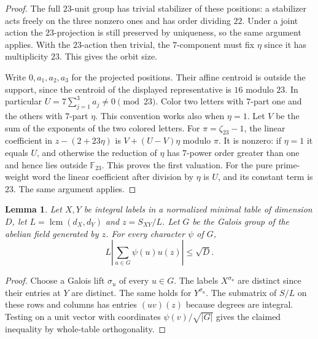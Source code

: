 \documentclass[11pt,a4paper]{article}
\numberwithin{equation}{section}
\newtheorem{lemma}[theorem]{Lemma}
\theoremstyle{remark}
\begin{document}
\begin{proof}
The full $23$-unit group has trivial stabilizer of these positions:
a stabilizer acts freely on the three nonzero ones and has order
dividing $22$. Under a joint action the $23$-projection is still
preserved by uniqueness, so the same argument applies. With the
$23$-action then trivial, the $7$-component must fix $\eta$ since
it has multiplicity $23$. This gives the orbit size.

Write $0,a_1,a_2,a_3$ for the projected positions.
Their affine centroid is outside the support,
since the centroid of the displayed representative is
$16$ modulo $23$. In particular $U=7\sum_{j=1}^3a_j\ne0\pmod{23}$.
Color two letters with $7$-part one and the others with $7$-part
$\eta$. This convention works also when $\eta=1$. Let $V$ be the sum
of the exponents of the two colored letters. For
$\pi=\zeta_{23}-1$, the linear coefficient in
$z-(2+23\eta)$ is $V+(U-V)\eta$ modulo $\pi$. It is nonzero:
if $\eta=1$ it equals $U$, and otherwise the reduction of $\eta$
has $7$-power order greater than one and hence lies outside
$\mathbb F_{23}$. This proves the first valuation. For the pure
prime-weight word the linear coefficient after division by $\eta$
is $U$, and its constant term is $23$. The same argument applies.
\end{proof}

\begin{lemma}\label{found:C:3.4}\label{found:C:key:lem:jointfourier}
Let $X,Y$ be integral labels in a normalized minimal table of
dimension $D$, let $L=\operatorname{lcm}(d_X,d_Y)$ and
$z=S_{XY}/L$. Let $G$ be the Galois group of the abelian field
generated by $z$. For every character $\psi$ of $G$,
\[
 L\left|\sum_{u\in G}\psi(u)u(z)\right|\le\sqrt D .
\]
\end{lemma}
\begin{proof}
Choose a Galois lift $\sigma_u$ of every $u\in G$. The labels
$X^{\sigma_u}$ are distinct since their entries at $Y$ are distinct.
The same holds for $Y^{\sigma_u}$. The submatrix of $S/L$ on these
rows and columns has entries $(uv)(z)$ because degrees are integral.
Testing on a unit vector with coordinates
$\psi(v)/\sqrt{|G|}$ gives the claimed inequality by whole-table
orthogonality.
\end{proof}
\end{document}
